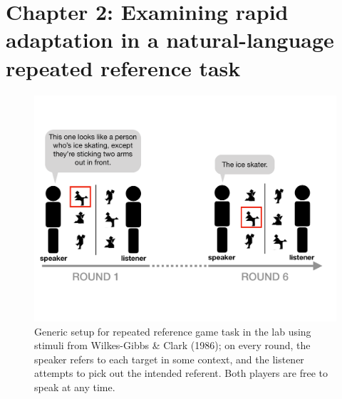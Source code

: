 \documentclass[12pt, donotrepeattitle, man, floatsintext]{apa6}
\begin{document}
    \vspace{1cm}

\noindent{}
\section{Chapter 2: Examining rapid adaptation in a natural-language repeated reference task }

\begin{figure}[t]
\centering
\includegraphics[scale=.45]{task_cropped.pdf}
\caption{Generic setup for repeated reference game task in the lab using stimuli from Wilkes-Gibbs \& Clark (1986); on every round, the speaker refers to each target in some context, and the listener attempts to pick out the intended referent. Both players are free to speak at any time.}
\label{fig:tangramsmethods}
\end{figure}
\end{document}
